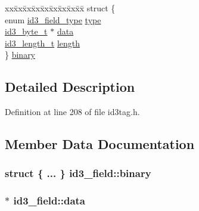 \begin{DoxyCompactItemize}
\begin{tabbing}
\end{tabbing}\item 
\begin{tabbing}
xx\=xx\=xx\=xx\=xx\=xx\=xx\=xx\=xx\=\kill
struct \{\\
\>enum \hyperlink{id3tag_8h_a0cb7be9ff485c843c1b69600f5c83d41}{id3\_field\_type} \hyperlink{unionid3__field_a3fd3df5b89abdcfc671708c145564c75}{type}\\
\>\hyperlink{id3tag_8h_ad73e16dd89b6d075d906ae0649cc7e43}{id3\_byte\_t} $\ast$ \hyperlink{unionid3__field_a4572aacd242e046d13364086e8219bc6}{data}\\
\>\hyperlink{id3tag_8h_a26fddaa5bcd55c38142a1fbed8d2835d}{id3\_length\_t} \hyperlink{unionid3__field_a2f14aceac1a2afa6e0692d8ac20d1807}{length}\\
\} \hyperlink{unionid3__field_a4c956a15bccc588aea29a9533c4c2bb4}{binary}\\

\end{tabbing}\end{DoxyCompactItemize}


\subsection{Detailed Description}


Definition at line 208 of file id3tag.\+h.



\subsection{Member Data Documentation}
\subsubsection[{\texorpdfstring{binary}{binary}}]{\setlength{\rightskip}{0pt plus 5cm}struct \{ ... \}   id3\+\_\+field\+::binary}\hypertarget{unionid3__field_a4c956a15bccc588aea29a9533c4c2bb4}{}\label{unionid3__field_a4c956a15bccc588aea29a9533c4c2bb4}
\subsubsection[{\texorpdfstring{data}{data}}]{$\ast$ id3\+\_\+field\+::data}\hypertarget{unionid3__field_a4572aacd242e046d13364086e8219bc6}{}\label{unionid3__field_a4572aacd242e046d13364086e8219bc6}


